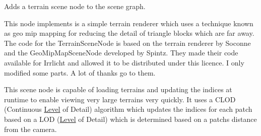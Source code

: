 Adds a terrain scene node to the scene graph. 

This node implements is a simple terrain renderer which uses a technique known as geo mip mapping for reducing the detail of triangle blocks which are far away. The code for the Terrain\+Scene\+Node is based on the terrain renderer by Soconne and the Geo\+Mip\+Map\+Scene\+Node developed by Spintz. They made their code available for Irrlicht and allowed it to be distributed under this licence. I only modified some parts. A lot of thanks go to them.

This scene node is capable of loading terrains and updating the indices at runtime to enable viewing very large terrains very quickly. It uses a C\+L\+OD (Continuous \hyperlink{classLevel}{Level} of Detail) algorithm which updates the indices for each patch based on a L\+OD (\hyperlink{classLevel}{Level} of Detail) which is determined based on a patch\textquotesingle{}s distance from the camera.

